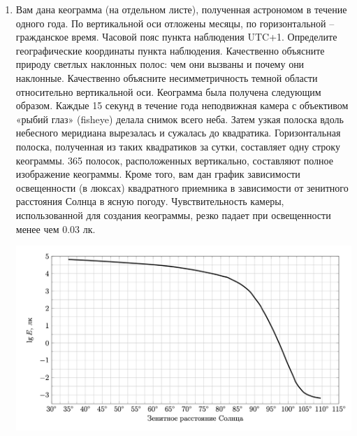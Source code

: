 \documentclass[12pt]{article}
\begin{document}
\begin{enumerate}
    \newpage
    \item Вам дана кеограмма (на отдельном листе), полученная астрономом в течение одного года. По вертикальной оси отложены месяцы, по горизонтальной -- гражданское время. Часовой пояс пункта наблюдения UTC+1.
    Определите географические координаты пункта наблюдения. Качественно объясните природу светлых наклонных полос: чем они вызваны и почему они наклонные. Качественно объясните несимметричность темной области относительно вертикальной оси.
    Кеограмма была получена следующим образом. Каждые 15 секунд в течение года неподвижная камера с объективом «рыбий глаз» (fisheye) делала снимок всего неба. Затем узкая полоска вдоль небесного меридиана вырезалась и сужалась до квадратика. Горизонтальная полоска, полученная из таких квадратиков за сутки, составляет одну строку кеограммы. 365 полосок, расположенных вертикально, составляют полное изображение кеограммы.
    Кроме того, вам дан график зависимости освещенности (в люксах) квадратного приемника в зависимости от зенитного расстояния Солнца в ясную погоду. Чувствительность камеры, использованной для создания кеограммы, резко падает при освещенности менее чем 0.03 лк.

    \includegraphics[width = 0.9\linewidth]{img1.png}


\end{enumerate}
\end{document}
